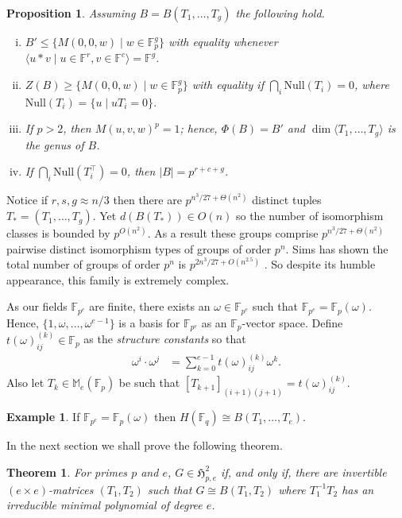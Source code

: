 \documentclass{toc}
\numberwithin{equation}{section}
\theoremstyle{plain}       %
\newtheorem{thm}[equation]{Theorem}
\newtheorem{prop}[equation]{Proposition}
\theoremstyle{remark}
\theoremstyle{definition}
\newtheorem{ex}[equation]{Example}  %
\numberwithin{figure}{section}
\numberwithin{table}{section}
\newcommand{\mygroups}{\mathfrak{H}}
\newcommand{\bbF}{\mathbb{F}}  %
\begin{document}
\begin{prop}\label{prop:basics}
	Assuming $B=B(T_1,\ldots,T_g)$ the following hold.
\begin{enumerate}[(i)]
	\item $B'\leq \{ M(0,0,w)\mid w\in \bbF^g_p\}$ with equality whenever
	$\langle u*v\mid u\in\bbF^r,v\in\bbF^c \rangle=\bbF^g$.
	\item $Z(B)\geq \{ M(0,0,w)\mid w\in \bbF^g_p\}$ with equality if 
	$\bigcap_i \mathrm{Null}(T_i)=0$, where $\mathrm{Null}(T_i)=\{u\mid uT_i=0\}$.
	\item If $p>2$, then $M(u,v,w)^p=1$; hence, $\Phi(B)=B'$ and $\dim \langle T_1,\ldots,T_g\rangle$ is the genus of $B$.
	\item If $\bigcap_i \mathrm{Null}(T_i^{\top})=0$, then $|B|=p^{r+c+g}$.
\end{enumerate}
\end{prop}

Notice if $r,s,g\approx n/3$ then there are $p^{n^3/27+\Theta(n^2)}$ distinct
tuples $T_*=(T_1,\ldots,T_g)$.  Yet $d(B(T_*))\in O(n)$ so the number of
isomorphism classes is bounded by $p^{O(n^2)}$.  As a result these groups
comprise $p^{n^3/27+\Theta(n^2)}$ pairwise distinct isomorphism types of groups
of order $p^n$.  Sims has shown the total number of groups of order $p^n$ is
$p^{2n^3/27+O(n^{2.5})}$ \cite[Chapters~4 \& 5]{BNV:enum}. So despite its humble
appearance, this family is extremely complex. 

As our fields $\bbF_{p^e}$ are finite, there exists an $\omega\in \bbF_{p^e}$
such that $\bbF_{p^e}=\bbF_p(\omega)$.  Hence, $\{1,\omega,\dots,\omega^{e-1}\}$
is a basis for $\bbF_{p^e}$ as an $\bbF_p$-vector space.  Define
$t(\omega)_{ij}^{(k)}\in\bbF_p$ as the \emph{structure constants} so that
\begin{align*}
	\omega^i\cdot \omega^j &= \sum_{k=0}^{e-1} t(\omega)_{ij}^{(k)} \omega^k.
\end{align*}
Also let $T_k\in\mathbb{M}_e(\bbF_p)$ be such that  $[T_{k+1}]_{(i+1)(j+1)}=t(\omega)_{ij}^{(k)}$. 
\begin{ex}
If $\bbF_{p^e}=\bbF_p(\omega)$ then $H(\bbF_q)  \cong B(T_1, \dots, T_e)$.
\end{ex}

In the next section we shall prove the following theorem.
\begin{thm}\label{thm:genus-2}
	For primes $p$ and $e$, $G\in \mygroups_{p,e}^{2}$ if, and only if, there
	are invertible $(e\times e)$-matrices $(T_1,T_2)$ such that $G\cong
	B(T_1,T_2)$ where $T_1^{-1}T_2$ has an irreducible minimal polynomial of
	degree $e$.
\end{thm}
\end{document}
